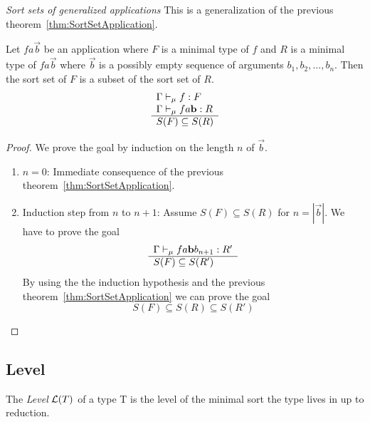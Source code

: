 \begin{theorem}
    \label{thm:SortSetApplications}
    \emph{Sort sets of generalized applications} This is a generalization of the
    previous theorem~\ref{thm:SortSetApplication}.

    Let $fa \vec b$ be an application where
    $F$ is a minimal type of $f$ and $R$ is a minimal type of $fa \vec b$ where
    $\vec b$ is a possibly empty sequence of arguments $b_1, b_2, \ldots, b_n$.
    Then the sort set of $F$ is a subset of the sort set of $R$.
    $$
    \begin{array}{l} 
        \Gamma \vdash_\mu f : F
        \\
        \Gamma \vdash_\mu f a {\mathbf b} : R
     \\ \hline 
        S(F) \subseteq S(R)
    \end{array}
    $$
    \begin{proof}
        We prove the goal by induction on the length $n$ of $\vec b$.
        \begin{enumerate}
            \item $n=0$: Immediate consequence of the previous
                theorem~\ref{thm:SortSetApplication}.

            \item Induction step from $n$ to $n+1$:
                Assume $S(F) \subseteq S(R)$ for $n = |\vec b|$. We have to
                prove the goal
                $$
                \begin{array}{l} 
                    \Gamma \vdash_\mu f a {\mathbf b} b_{n+1} : R'
                 \\ \hline 
                    S(F) \subseteq S(R')
                \end{array}
                $$
                By using the the induction hypothesis and the previous
                theorem~\ref{thm:SortSetApplication} we can prove the goal
                $$
                    S(F) \subseteq S(R) \subseteq S(R')
                $$
        \end{enumerate}
    \end{proof}
\end{theorem}






\subsection{Level}


\begin{definition}
    The \emph{Level} ${\cal L}(T)$ of a type T is the level of the minimal sort
    the type lives in up to reduction.
\end{definition}


